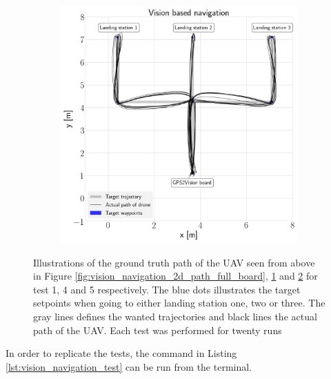 \documentclass[../Head/report.tex]{subfiles}
\begin{document}
\begin{figure}[H]
\begin{subfigure}[t]{.30\textwidth}
        \caption{}
        \label{fig:vision_navigation_2d_path_missing_markers_wear_vel_1.0}
    \end{subfigure}
     \hspace{0.2em}
    \begin{subfigure}[t]{.30\textwidth}
        \centering
        \includegraphics[width=\textwidth]{../Figures/vision_navigation/test5_one_pattern_missing_markers_wear_board/2d_path.png}
        \caption{}
        \label{fig:vision_navigation_2d_path_missing_markers_wear_vel_5.0}
    \end{subfigure}
    \caption{Illustrations of the ground truth path of the UAV seen from above in Figure \ref{fig:vision_navigation_2d_path_full_board}, \ref{fig:vision_navigation_2d_path_missing_markers_wear_vel_1.0} and \ref{fig:vision_navigation_2d_path_missing_markers_wear_vel_5.0} for test 1, 4 and 5 respectively. The blue dots illustrates the target setpoints when going to either landing station one, two or three. The gray lines defines the wanted trajectories and black lines the actual path of the UAV. Each test was performed for twenty runs}
    \label{fig:vision_navigation_2d_path}
\end{figure}  

In order to replicate the tests, the command in Listing \ref{lst:vision_navigation_test} can be run from the terminal.
\end{document}
